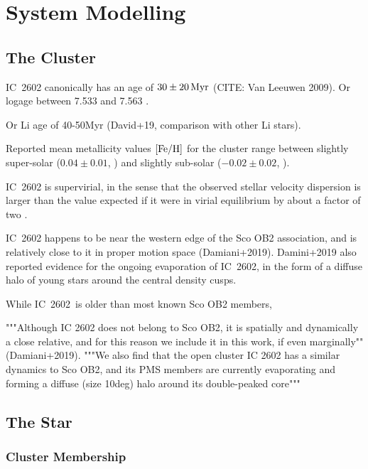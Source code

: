 \documentclass[12pt,twocolumn,tighten]{aastex62}
\newcommand{\cn}{IC~2602} %
\begin{document}
\section{System Modelling}
\label{sec:system}

\subsection{The Cluster}
\label{subsec:cluster}


IC~2602 canonically has an age of $30\pm20\,{\rm Myr}$ (CITE: Van
Leeuwen 2009).
Or logage between 7.533 and 7.563	\citep{bossini_age_2019}.

Or Li age of 40-50Myr (David+19, comparison with other Li stars).

Reported mean metallicity values ${\rm [Fe/H]}$ for the cluster range between
slightly super-solar ($0.04\pm0.01$, \citealt{baratella_gaia-eso_2020}) and
slightly sub-solar ($-0.02 \pm 0.02$, \citealt{netopil_metallicity_2016}).

IC~2602 is supervirial, in the sense that the observed stellar velocity
dispersion is larger than the value expected if it were in virial equilibrium
by about a factor of two \citep{bravi_gaia-eso_2018}.

IC~2602 happens to be near the western edge of the Sco OB2
association, and is relatively close to it in proper motion space
(Damiani+2019).
Damini+2019 also reported evidence for the ongoing evaporation of
\cn, in the form of a diffuse halo of young stars around the central
density cusps.

While \cn\ is older than most known Sco OB2 members,

"""Although IC 2602 does not belong to Sco OB2, it is
spatially and dynamically a close relative, and for this reason
we include it in this work, if even marginally"" (Damiani+2019).
"""We also find that the open cluster IC 2602 has a similar dynamics
to Sco OB2, and its PMS members are currently evaporating and forming
a diffuse (size 10deg) halo around its double-peaked core"""


\subsection{The Star}
\label{subsec:star}
\subsubsection{Cluster Membership}
\label{subsec:member}
\end{document}
